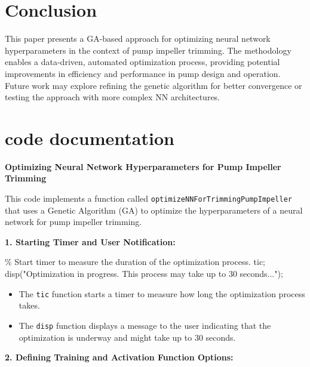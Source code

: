 \documentclass[
  super,
  review,
  3p]{elsarticle}
\newenvironment{Shaded}{\begin{snugshade}}{\end{snugshade}}
\newcommand{\CommentTok}[1]{\textcolor[rgb]{0.37,0.37,0.37}{#1}}
\newcommand{\NormalTok}[1]{\textcolor[rgb]{0.00,0.23,0.31}{#1}}
\newcommand{\OperatorTok}[1]{\textcolor[rgb]{0.37,0.37,0.37}{#1}}
\newcommand{\StringTok}[1]{\textcolor[rgb]{0.13,0.47,0.30}{#1}}
\newcommand{\VariableTok}[1]{\textcolor[rgb]{0.07,0.07,0.07}{#1}}
\providecommand{\tightlist}{%
  \setlength{\itemsep}{0pt}\setlength{\parskip}{0pt}}\usepackage{longtable,booktabs,array}
\begin{document}
\section{Conclusion}\label{conclusion}

This paper presents a GA-based approach for optimizing neural network
hyperparameters in the context of pump impeller trimming. The
methodology enables a data-driven, automated optimization process,
providing potential improvements in efficiency and performance in pump
design and operation. Future work may explore refining the genetic
algorithm for better convergence or testing the approach with more
complex NN architectures.

\section{code documentation}\label{code-documentation}

\textbf{Optimizing Neural Network Hyperparameters for Pump Impeller
Trimming}

This code implements a function called
\texttt{optimizeNNForTrimmingPumpImpeller} that uses a Genetic Algorithm
(GA) to optimize the hyperparameters of a neural network for pump
impeller trimming.

\textbf{1. Starting Timer and User Notification:}

\begin{Shaded}
\begin{Highlighting}[]
    \CommentTok{\% Start timer to measure the duration of the optimization process.}
    \VariableTok{tic}\OperatorTok{;}
    \VariableTok{disp}\NormalTok{(}\StringTok{"Optimization in progress. This process may take up to 30 seconds..."}\NormalTok{)}\OperatorTok{;}
\end{Highlighting}
\end{Shaded}

\begin{itemize}
\tightlist
\item
  The \texttt{tic} function starts a timer to measure how long the
  optimization process takes.
\item
  The \texttt{disp} function displays a message to the user indicating
  that the optimization is underway and might take up to 30 seconds.
\end{itemize}

\textbf{2. Defining Training and Activation Function Options:}
\end{document}
